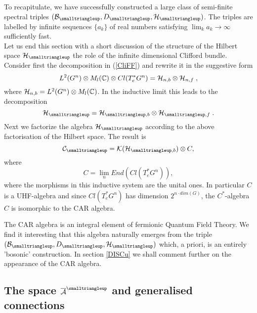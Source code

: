 \documentclass[12pt]{article}
\def\ca{{\cal A}}
\def\cb{{\cal B}}
\def\cc{{\cal C}}
\def\ch{{\cal H}}
\def\ck{{\cal K}}
\begin{document}
To recapitulate, we have successfully constructed a large class of semi-finite spectral triples $(\cb_{\smalltriangleup},D_{\smalltriangleup},\ch_\smalltriangleup)$. The triples are labelled by infinite sequences $\{a_k\}$ of real numbers satisfying $\lim_k a_k\rightarrow\infty$ sufficiently fast.\\


Let us end this section with a short discussion of the structure of the Hilbert space $\ch_\smalltriangleup$ the role of the infinite dimensional Clifford bundle. Consider first the decomposition in (\ref{CliFF}) and rewrite it in the suggestive form
\[
L^2(G^n )\otimes M_l(\mathbb{C}) \otimes Cl(T^*_e G^n)= \ch_{n,b}\otimes \ch_{n,f}\;,
\]
where $\ch_{n,b}=L^2(G^n )\otimes M_l(\mathbb{C})$. In the inductive limit this leads to the decomposition
\[
\ch_\smalltriangleup = \ch_{\smalltriangleup,b}\otimes \ch_{\smalltriangleup,f}\;.
\]
Next we factorize the algebra $\ch_\smalltriangleup$ according to the above factorisation of the Hilbert space. The result is 
$$\cc_\smalltriangleup=\ck ( \ch_{\smalltriangleup,b})\otimes C , $$
where 
$$C=\lim_n End( Cl(T^*_eG^n)),$$
where the morphisms in this inductive system are the unital ones. In particular $C$ is a UHF-algebra and since $Cl(T^*_eG^n)$ has dimension $2^{n\cdot dim (G)}$, the $C^*$-algebra $C$ is isomorphic to the CAR algebra.



The CAR algebra is an integral element of fermionic Quantum Field Theory. We find it interesting that this algebra naturally emerges from the triple $(\cb_{\smalltriangleup},D_{\smalltriangleup},\ch_\smalltriangleup)$ which, a priori, is an entirely 'bosonic' construction. In section \ref{DISCu} we shall comment further on the appearance of the CAR algebra.
















\subsection{The space $\overline{\ca}^{\smalltriangleup}$ and generalised connections}
\label{funcspace}
\end{document}
